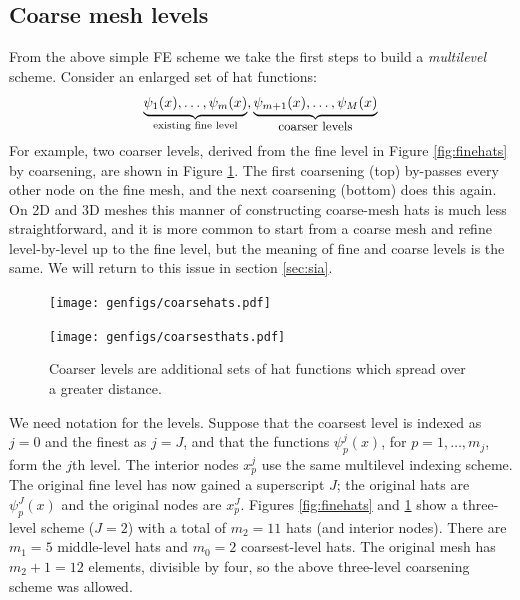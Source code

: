 \documentclass[letterpaper,final,12pt,reqno]{amsart}
\theoremstyle{claim}
\numberwithin{equation}{section}
\numberwithin{figure}{section}
\numberwithin{table}{section}
\begin{document}
\subsection*{Coarse mesh levels}  From the above simple FE scheme we take the first steps to build a \emph{multilevel} scheme.  Consider an enlarged set of hat functions:
    $$\underbrace{\psi_1(x),\dots,\psi_m(x)}_{\text{existing fine level}},\underbrace{\psi_{m+1}(x),\dots,\psi_M(x)}_{\text{\small coarser levels}}$$
For example, two coarser levels, derived from the fine level in Figure \ref{fig:finehats} by coarsening, are shown in Figure \ref{fig:coarsehats}.  The first coarsening (top) by-passes every other node on the fine mesh, and the next coarsening (bottom) does this again.  On 2D and 3D meshes this manner of constructing coarse-mesh hats is much less straightforward, and it is more common to start from a coarse mesh and refine level-by-level up to the fine level, but the meaning of fine and coarse levels is the same.  We will return to this issue in section \ref{sec:sia}.

\begin{figure}
\texttt{[image: genfigs/coarsehats.pdf]}
\smallskip

\texttt{[image: genfigs/coarsesthats.pdf]}
\caption{Coarser levels are additional sets of hat functions which spread over a greater distance.}
\label{fig:coarsehats}
\end{figure}

We need notation for the levels.  Suppose that the coarsest level is indexed as $j=0$ and the finest as $j=J$, and that the functions $\psi_p^j(x)$, for $p=1,\dots,m_j$, form the $j$th level.  The interior nodes $x_p^j$ use the same multilevel indexing scheme.  The original fine level has now gained a superscript $J$; the original hats are $\psi_p^J(x)$ and the original nodes are $x_p^J$.  Figures \ref{fig:finehats} and \ref{fig:coarsehats} show a three-level scheme ($J=2$) with a total of $m_2=11$ hats (and interior nodes).  There are $m_1=5$ middle-level hats and $m_0=2$ coarsest-level hats.  The original mesh has $m_2+1=12$ elements, divisible by four, so the above three-level coarsening scheme was allowed.
\end{document}
